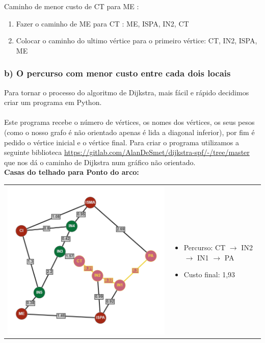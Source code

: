\documentclass[12pt]{article}
\begin{document}
    \noindent Caminho de menor custo de CT para ME :  
   \begin{enumerate}
       \item Fazer o caminho de ME para CT : ME, ISPA, IN2, CT
       \item Colocar o caminho do ultimo vértice para o primeiro vértice: CT, IN2, ISPA, ME
   \end{enumerate}
   \newpage
    \subsubsection{b) O percurso com menor custo entre cada dois locais}
    \noindent Para tornar o processo do algoritmo de Dijkstra, mais fácil e rápido decidimos criar um programa em Python.\\\\
    Este programa recebe o número de vértices, os nomes dos vértices, os seus pesos (como o nosso grafo é não orientado apenas é lida a diagonal inferior), por fim é pedido o vértice inicial e o vértice final. Para criar o programa utilizamos a seguinte biblioteca \url{https://gitlab.com/AlanDeSmet/dijkstra-spf/-/tree/master}  que nos dá o caminho de Dijkstra num gráfico não orientado.\\
    
   \noindent  \textbf{Casas do telhado para Ponto do arco:}\\
    \begin{tabular}{@{}m{}m{}@{}}
      \centering\includegraphics[scale=0.4]{anexos/CT-PA.png} &
      \begin{itemize}
        \item  Percurso: CT $\rightarrow$ IN2 $\rightarrow$ IN1 $\rightarrow$ PA
        \item  Custo final: 1,93
      \end{itemize}
    \end{tabular}
    
\end{document}
